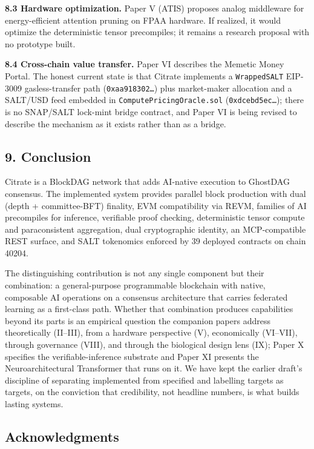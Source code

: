 \textbf{8.3 Hardware optimization.} Paper V (ATIS) proposes analog
middleware for energy-efficient attention pruning on FPAA hardware. If
realized, it would optimize the deterministic tensor precompiles; it
remains a research proposal with no prototype built.

\textbf{8.4 Cross-chain value transfer.} Paper VI describes the Memetic
Money Portal. The honest current state is that Citrate implements a
\texttt{WrappedSALT} EIP-3009 gasless-transfer path
(\texttt{0xaa918302…}) plus market-maker allocation and a SALT/USD feed
embedded in \texttt{ComputePricingOracle.sol} (\texttt{0xdcebd5ec…});
there is no SNAP/SALT lock-mint bridge contract, and Paper VI is being
revised to describe the mechanism as it exists rather than as a bridge.

\subsection{9. Conclusion}\label{conclusion}

Citrate is a BlockDAG network that adds AI-native execution to GhostDAG
consensus. The implemented system provides parallel block production
with dual (depth + committee-BFT) finality, EVM compatibility via REVM,
families of AI precompiles for inference, verifiable proof checking,
deterministic tensor compute and paraconsistent aggregation, dual
cryptographic identity, an MCP-compatible REST surface, and SALT
tokenomics enforced by 39 deployed contracts on chain 40204.

The distinguishing contribution is not any single component but their
combination: a general-purpose programmable blockchain with native,
composable AI operations on a consensus architecture that carries
federated learning as a first-class path. Whether that combination
produces capabilities beyond its parts is an empirical question the
companion papers address theoretically (II--III), from a hardware
perspective (V), economically (VI--VII), through governance (VIII), and
through the biological design lens (IX); Paper X specifies the
verifiable-inference substrate and Paper XI presents the
Neuroarchitectural Transformer that runs on it. We have kept the earlier
draft's discipline of separating implemented from specified and
labelling targets as targets, on the conviction that credibility, not
headline numbers, is what builds lasting systems.

\subsection{Acknowledgments}\label{acknowledgments}

